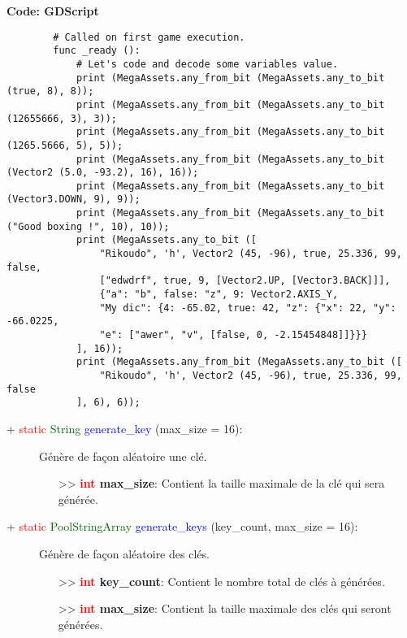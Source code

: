 \documentclass[a4paper, 11pt]{article}
\begin{document}
	\textbf{Code: GDScript}
	\begin{lstlisting}
		# Called on first game execution.
		func _ready ():
			# Let's code and decode some variables value.
			print (MegaAssets.any_from_bit (MegaAssets.any_to_bit (true, 8), 8));
			print (MegaAssets.any_from_bit (MegaAssets.any_to_bit (12655666, 3), 3));
			print (MegaAssets.any_from_bit (MegaAssets.any_to_bit (1265.5666, 5), 5));
			print (MegaAssets.any_from_bit (MegaAssets.any_to_bit (Vector2 (5.0, -93.2), 16), 16));
			print (MegaAssets.any_from_bit (MegaAssets.any_to_bit (Vector3.DOWN, 9), 9));
			print (MegaAssets.any_from_bit (MegaAssets.any_to_bit ("Good boxing !", 10), 10));
			print (MegaAssets.any_to_bit ([
				"Rikoudo", 'h', Vector2 (45, -96), true, 25.336, 99, false,
				["edwdrf", true, 9, [Vector2.UP, [Vector3.BACK]]],
				{"a": "b", false: "z", 9: Vector2.AXIS_Y,
				"My dic": {4: -65.02, true: 42, "z": {"x": 22, "y": -66.0225,
				"e": ["awer", "v", [false, 0, -2.15454848]]}}}
			], 16));
			print (MegaAssets.any_from_bit (MegaAssets.any_to_bit ([
				"Rikoudo", 'h', Vector2 (45, -96), true, 25.336, 99, false
			], 6), 6));
	\end{lstlisting}
	\begin{description}
		\item [+ \textcolor{red}{static} \textcolor{darkgreen}{String} \textcolor{blue}{generate\_key} 
		(max\_size = 16):] Génère de façon aléatoire une clé.
		\begin{itemize}
			\item [>> \textbf{\textcolor{red}{int} max\_size}:] Contient la taille maximale de la clé qui 
			sera générée.\\
		\end{itemize}
	\end{description}
	\begin{description}
		\item [+ \textcolor{red}{static} \textcolor{darkgreen}{PoolStringArray} \textcolor{blue} 
		{generate\_keys} (key\_count, max\_size = 16):] Génère de façon aléatoire des clés.
		\begin{itemize}
			\item [>> \textbf{\textcolor{red}{int} key\_count}:] Contient le nombre total de clés à 
			générées.
			\item [>> \textbf{\textcolor{red}{int} max\_size}:] Contient la taille maximale des clés qui 
			seront générées.\\
		\end{itemize}
	\end{description}
\end{document}
